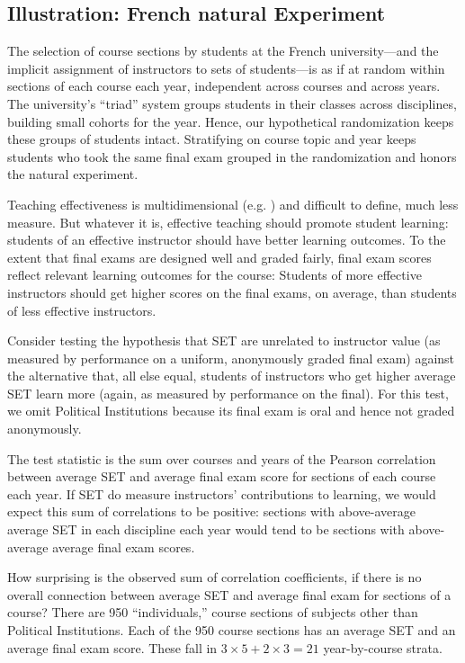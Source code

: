 \documentclass[12pt]{article}
\begin{document}
\subsection{Illustration: French natural Experiment} \label{sec:boringMethods}
The selection of course sections by students at the French university---and the implicit 
assignment of instructors to sets of students---is as if at random within sections of each
course each year, independent across courses and across years.
The university's ``triad'' system groups students in their classes across disciplines,
building small cohorts for the year.
Hence, our hypothetical randomization keeps these groups of students intact.
Stratifying on course topic and year keeps students who took the same final
exam grouped in the randomization and honors the natural experiment.

Teaching effectiveness is multidimensional (e.g. \citet{Marsh1997}) and difficult to define,
much less measure. 
But whatever it is, effective teaching should promote student learning:
students of an effective instructor should have better learning outcomes. 
To the extent that final exams are designed well and graded fairly, final exam scores 
reflect relevant learning outcomes for
the course:
Students of more effective instructors should get higher scores on the final exams, on average,
than students of less effective instructors.

Consider testing the hypothesis that SET are unrelated to instructor value (as 
measured by performance on a uniform, anonymously graded final exam)
against the alternative that, all else equal, students of instructors who get higher average SET
learn more (again, as measured by performance on the final).
For this test, we omit Political Institutions because its final exam is oral 
and hence not graded anonymously.

The test statistic is the sum over courses and years of the Pearson correlation between
average SET and average final exam score for sections of each course each year.
If SET do measure instructors' contributions to learning, we would expect this sum of
correlations to be positive: sections with above-average average SET in each discipline each year
would tend to be sections with above-average average final exam scores.

How surprising is the observed sum of correlation coefficients, if there is no overall
connection between average SET and average final exam for sections of a course?
There are 950 ``individuals,'' course sections of subjects other
than Political Institutions.
Each of the 950 course sections has an average SET and an average final exam score.
These fall in $3\times5 + 2 \times 3 = 21$ year-by-course strata.
 
\end{document}
